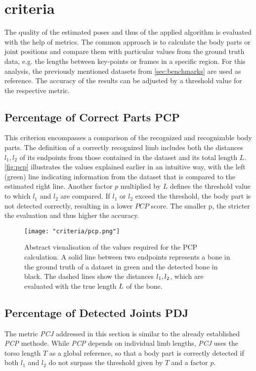 \section{criteria}
The quality of the estimated poses and thus of the applied algorithm is evaluated with the help of metrics. The common approach is to calculate the body parts or joint positions and compare them with particular values from the ground truth data, e.g. the lengths between key-points or frames in a specific region. For this analysis, the previously mentioned datasets from \autoref{sec:benchmarks} are used as reference. The accuracy of the results can be adjusted by a threshold value for the respective metric.

\subsection{Percentage of Correct Parts PCP}
\label{sec:pcp}
This criterion encompasses a comparison of the recognized and recognizable body parts. The definition of a correctly recognized limb includes both the distances $l_{1}, l_{2}$ of its endpoints from those contained in the dataset and its total length $L$. \autoref{fig:pcp} illustrates the values explained earlier in an intuitive way, with the left (green) line indicating information from the dataset that is compared to the estimated right line. Another factor $p$ multiplied by $L$ defines the threshold value to which $l_{1}$ and $l_{2}$ are compared. If $l_{1}$ or $l_{2}$ exceed the threshold, the body part is not detected correctly, resulting in a lower $PCP$ score.
The smaller p, the stricter the evaluation and thus higher the accuracy.\cite{pcp}

\begin{figure}[h]
\centering
\texttt{[image: "criteria/pcp.png"]}
\caption{Abstract visualisation of the values required for the PCP calculation. A solid line between two endpoints represents a bone in the ground truth of a dataset in green and the detected bone in black. The dashed lines show the distances $\protect l_{1}, l_{2}$, which are evaluated with the true length $\protect L$ of the bone.}
\label{fig:pcp}
\end{figure}

\subsection{Percentage of Detected Joints PDJ}
\label{sec:pdj}
The metric \emph{PCJ} addressed in this section is similar to the already established \emph{PCP} methode. While \emph{PCP} depends on individual limb lengths, \emph{PCJ} uses the torso length $T$ as a global reference, so that a body part is correctly detected if both $l_{1}$ and $l_{2}$ do not surpass the threshold given by $T$ and a factor $p$. \cite{pdj}

